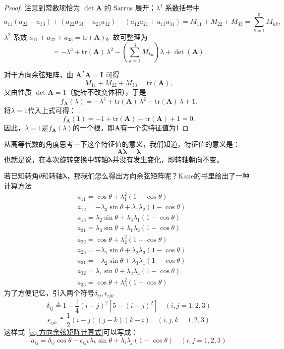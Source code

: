 \begin{proof}
    注意到常数项恰为 $\det\bm{A}$ 的 Sarrus 展开；$\lambda^{1}$ 系数括号中
    \[
    a_{11}(a_{22}+a_{33})+(a_{22}a_{33}-a_{23}a_{32})-(a_{12}a_{21}+a_{13}a_{31})
    =M_{11}+M_{22}+M_{33}=\sum_{k=1}^{3}M_{kk},
    \]
    $\lambda^{2}$ 系数 $a_{11}+a_{22}+a_{33}=\mathrm{tr}(\bm{A})$。故可整理为
    \[
    = -\lambda^{3} + \mathrm{tr}(\bm{A})\,\lambda^{2} - \left(\sum_{k=1}^{3}M_{kk}\right)\lambda + \det(\bm{A}).
    \]

    对于方向余弦矩阵，由 $\bm{A}^{T}\bm{A}=\bm{I}$ 可得
    \[
    M_{11}+M_{22}+M_{33} = \mathrm{tr}(\bm{A}),
    \]
    又由性质 $\det\bm{A}=1$（旋转不改变体积），于是
    \[
    f_{\bm{A}}(\lambda) = -\lambda^{3} + \mathrm{tr}(\bm{A})\,\lambda^{2} - \mathrm{tr}(\bm{A})\,\lambda + 1.
    \]
    将$\lambda=1$代入上式可得：
\[
f_{\bm{A}}(1) = -1 + \mathrm{tr}(\bm{A}) - \mathrm{tr}(\bm{A}) + 1 = 0.
\]
    因此，$\lambda=1$是$f_{\bm{A}}(\lambda)$的一个根，即$\bm{A}$有一个实特征值为1
\end{proof}

从高等代数的角度思考一下这个特征值的意义，我们知道，特征值的意义是：
\begin{equation}
    \bm{A}\bm{\lambda}=\bm{\lambda}
\end{equation}
也就是说，在本次旋转变换中转轴$\bm{\lambda}$并没有发生变化，即转轴朝向不变。

若已知转角$\theta$和转轴$\bm{\lambda}$，那我们怎么得出方向余弦矩阵呢？Kane的书里给出了一种计算方法
\begin{equation}
    \label{eq:方向余弦矩阵计算式}
    \begin{aligned}&a_{11}=\cos\theta+\lambda_1^2(1-\cos\theta)\\&a_{12}=-\lambda_3\sin\theta+\lambda_1\lambda_2(1-\cos\theta)\\&a_{13}=\lambda_2\sin\theta+\lambda_3\lambda_1(1-\cos\theta)\\&a_{21}=\lambda_3\sin\theta+\lambda_1\lambda_2(1-\cos\theta)\\&a_{22}=\cos\theta+\lambda_2^2(1-\cos\theta)\\&a_{23}=-\lambda_1\sin\theta+\lambda_2\lambda_3(1-\cos\theta)\\&a_{31}=-\lambda_2\sin\theta+\lambda_3\lambda_1(1-\cos\theta)\\&a_{32}=\lambda_1\sin\theta+\lambda_2\lambda_3(1-\cos\theta)\\&a_{33}=\cos\theta+\lambda_3^2(1-\cos\theta)
\end{aligned}
\end{equation}
为了方便记忆，引入两个符号$\delta_{ij},\epsilon_{ijk}$
\begin{equation}
    \delta_{ij}\triangleq1-\frac{1}{4}(i-j)^2[5-(i-j)^2]\quad(i,j=1,2,3)
\end{equation}
\begin{equation}
    \epsilon_{ijk}\triangleq\frac{1}{2}(i-j)(j-k)(k-i)\quad(i,j,k=1,2,3)
    \label{eq:epsilon_ijk定义}
\end{equation}
这样式~\eqref{eq:方向余弦矩阵计算式}可以写成：
\begin{equation}
    a_{ij}=\delta_{ij}\cos\theta-\epsilon_{ijk}\lambda_{k}\sin\theta+\lambda_{i}\lambda_{j}(1-\cos\theta)\quad(i,j=1,2,3)
    \label{eq:方向余弦矩阵计算式紧凑}
\end{equation}

